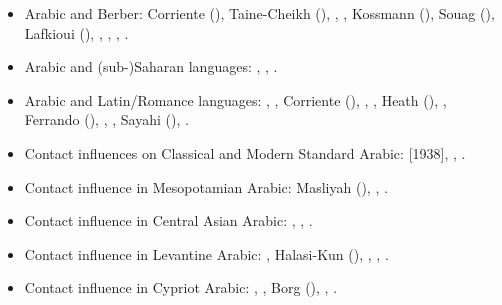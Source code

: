 \documentclass[output=paper]{langsci/langscibook}
\begin{document}
\begin{itemize}[noitemsep,leftmargin=11pt]
\item[\adfhalfrightarrowhead]Arabic and Berber: Corriente (\citeyear{Corriente1998Berber,Corriente2002}), Taine-Cheikh (\citeyear{Taine-Cheikh1997Zenaga,Taine-Cheikh2008chapter,Taine-Cheikh2012,Taine-Cheikh2018quadri}), \citet{Brahimi2000}, \citet{Ameur2008}, Kossmann
(\citeyear{Kossmann2009,Kossmann2010,Kossmann2013book,Kossmann2013chapter,Kossmann2014}), Souag (\citeyear{Souag2007,Souag2009,Souag2013book,Souag2018berber,Souag2018thing}), Lafkioui (\citeyear{Lafkioui2013reinventing,Lafkioui2013bu}), \citet{Tigziri2008}, \citet{ElAissati2011}, \citet{vanPuttenSouag2015}, \citet{vanPuttenBenkato2017}.

\item[\adfhalfrightarrowhead]Arabic and (sub-)Saharan languages: \citet{Owens2000article,Owens2015,Owens2016idioms}, \citet{OwensHassan2004}, \citet{Souag2013lexical,Souag2016sahara}.

\item[\adfhalfrightarrowhead]Arabic and Latin/Romance languages: \citet{Brunot1949}, \citet{Benoliel1977}, Corriente (\citeyear{Corriente1978,Corriente1992chapter,Corriente1992book,Corriente2000,Corriente2005,Corriente2008}), \citet{Talmoudi1986}, \citet{Abdu1988}, Heath (\citeyear{Heath1989,Heath1999,Heath2015}), \citet{Cifoletti1994}, Ferrando (\citeyear{Ferrando1995,Ferrando1997}), \citet{OuldMohamedBaba2003}, \citet{Vicente2006}, Sayahi
(\citeyear{Sayahi2011,Sayahi2014,Sayahi2015}), \citet{Danna2018phonetic}.

\item[\adfhalfrightarrowhead]Contact influences on Classical and Modern Standard Arabic: \citet{Jeffrey2007} [1938], \citet{Blau1969}, \citet{Hebbo1984}.

\item[\adfhalfrightarrowhead]Contact influence in Mesopotamian Arabic: Masliyah (\citeyear{Masliyah1996,Masliyah1997}), \citet{MatrasShabibi2007}, \citet{ElZarkaZiagos2019}.

\item[\adfhalfrightarrowhead]Contact influence in Central Asian Arabic: \citet{Jastrow2005}, \citet{Ratcliffe2005}, \citet{Ingham2011afg}.

\item[\adfhalfrightarrowhead]Contact influence in Levantine Arabic: \citet{Barbot1961}, Halasi-Kun (\citeyear{Halasi-Kun1969,Halasi-Kun1973,Halasi-Kun1982}), \citet{Hopkins1995}, \citet{Contini1999}, \citet{Neishtadt2015}.

\item[\adfhalfrightarrowhead]Contact influence in Cypriot Arabic: \citet{Newton1964}, \citet{Tsiapera1964}, Borg (\citeyear{Borg1985,Borg1997CMA,Borg2004}), \citet{Roth2004}, \citet{Gulle2016}.


\end{itemize}
\end{document}

